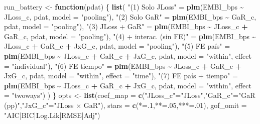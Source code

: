 \documentclass[
]{article}
\newenvironment{Shaded}{\begin{snugshade}}{\end{snugshade}}
\newcommand{\AttributeTok}[1]{\textcolor[rgb]{0.13,0.29,0.53}{#1}}
\newcommand{\ControlFlowTok}[1]{\textcolor[rgb]{0.13,0.29,0.53}{\textbf{#1}}}
\newcommand{\DecValTok}[1]{\textcolor[rgb]{0.00,0.00,0.81}{#1}}
\newcommand{\FunctionTok}[1]{\textcolor[rgb]{0.13,0.29,0.53}{\textbf{#1}}}
\newcommand{\NormalTok}[1]{#1}
\newcommand{\OtherTok}[1]{\textcolor[rgb]{0.56,0.35,0.01}{#1}}
\newcommand{\SpecialCharTok}[1]{\textcolor[rgb]{0.81,0.36,0.00}{\textbf{#1}}}
\newcommand{\StringTok}[1]{\textcolor[rgb]{0.31,0.60,0.02}{#1}}
\begin{document}
\begin{Shaded}
\begin{Highlighting}[]
\NormalTok{run\_battery }\OtherTok{\textless{}{-}} \ControlFlowTok{function}\NormalTok{(pdat) \{}
  \FunctionTok{list}\NormalTok{(}
    \StringTok{"(1) Solo JLoss"}          \OtherTok{=} \FunctionTok{plm}\NormalTok{(EMBI\_bps }\SpecialCharTok{\textasciitilde{}}\NormalTok{ JLoss\_c,                  pdat, }\AttributeTok{model =} \StringTok{"pooling"}\NormalTok{),}
    \StringTok{"(2) Solo GaR"}            \OtherTok{=} \FunctionTok{plm}\NormalTok{(EMBI\_bps }\SpecialCharTok{\textasciitilde{}}\NormalTok{ GaR\_c,                    pdat, }\AttributeTok{model =} \StringTok{"pooling"}\NormalTok{),}
    \StringTok{"(3) JLoss + GaR"}         \OtherTok{=} \FunctionTok{plm}\NormalTok{(EMBI\_bps }\SpecialCharTok{\textasciitilde{}}\NormalTok{ JLoss\_c }\SpecialCharTok{+}\NormalTok{ GaR\_c,          pdat, }\AttributeTok{model =} \StringTok{"pooling"}\NormalTok{),}
    \StringTok{"(4) + interac. (sin FE)"} \OtherTok{=} \FunctionTok{plm}\NormalTok{(EMBI\_bps }\SpecialCharTok{\textasciitilde{}}\NormalTok{ JLoss\_c }\SpecialCharTok{+}\NormalTok{ GaR\_c }\SpecialCharTok{+}\NormalTok{ JxG\_c,  pdat, }\AttributeTok{model =} \StringTok{"pooling"}\NormalTok{),}
    \StringTok{"(5) FE país"}             \OtherTok{=} \FunctionTok{plm}\NormalTok{(EMBI\_bps }\SpecialCharTok{\textasciitilde{}}\NormalTok{ JLoss\_c }\SpecialCharTok{+}\NormalTok{ GaR\_c }\SpecialCharTok{+}\NormalTok{ JxG\_c,  pdat, }\AttributeTok{model =} \StringTok{"within"}\NormalTok{, }\AttributeTok{effect =} \StringTok{"individual"}\NormalTok{),}
    \StringTok{"(6) FE tiempo"}           \OtherTok{=} \FunctionTok{plm}\NormalTok{(EMBI\_bps }\SpecialCharTok{\textasciitilde{}}\NormalTok{ JLoss\_c }\SpecialCharTok{+}\NormalTok{ GaR\_c }\SpecialCharTok{+}\NormalTok{ JxG\_c,  pdat, }\AttributeTok{model =} \StringTok{"within"}\NormalTok{, }\AttributeTok{effect =} \StringTok{"time"}\NormalTok{),}
    \StringTok{"(7) FE país + tiempo"}    \OtherTok{=} \FunctionTok{plm}\NormalTok{(EMBI\_bps }\SpecialCharTok{\textasciitilde{}}\NormalTok{ JLoss\_c }\SpecialCharTok{+}\NormalTok{ GaR\_c }\SpecialCharTok{+}\NormalTok{ JxG\_c,  pdat, }\AttributeTok{model =} \StringTok{"within"}\NormalTok{, }\AttributeTok{effect =} \StringTok{"twoways"}\NormalTok{)}
\NormalTok{  )}
\NormalTok{\}}
\NormalTok{opts }\OtherTok{\textless{}{-}} \FunctionTok{list}\NormalTok{(}\AttributeTok{coef\_map =} \FunctionTok{c}\NormalTok{(}\StringTok{"JLoss\_c"}\OtherTok{=}\StringTok{"JLoss"}\NormalTok{,}\StringTok{"GaR\_c"}\OtherTok{=}\StringTok{"GaR (pp)"}\NormalTok{,}\StringTok{"JxG\_c"}\OtherTok{=}\StringTok{"JLoss × GaR"}\NormalTok{),}
             \AttributeTok{stars =} \FunctionTok{c}\NormalTok{(}\StringTok{\textquotesingle{}*\textquotesingle{}}\OtherTok{=}\NormalTok{.}\DecValTok{1}\NormalTok{,}\StringTok{\textquotesingle{}**\textquotesingle{}}\OtherTok{=}\NormalTok{.}\DecValTok{05}\NormalTok{,}\StringTok{\textquotesingle{}***\textquotesingle{}}\OtherTok{=}\NormalTok{.}\DecValTok{01}\NormalTok{), }\AttributeTok{gof\_omit =} \StringTok{"AIC|BIC|Log.Lik|RMSE|Adj"}\NormalTok{)}


\end{Highlighting}
\end{Shaded}
\end{document}
